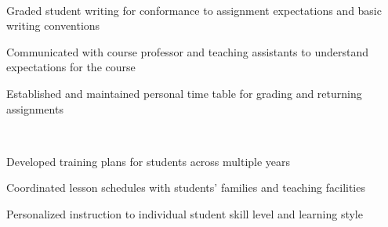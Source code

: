\documentclass[]{deedy-resume-chloedorst}
\begin{document}
\begin{minipage}[t]{0.66\textwidth}
\begin{tightemize}
\end{tightemize}
\sectionsep
\sectionsep
\sectionsep
{} 
\sectionsep\\
\begin{tightemize}
	\item Graded student writing for conformance to assignment expectations and basic writing conventions
	\item Communicated with course professor and teaching assistants to understand expectations for the course
	\item Established and maintained personal time table for grading and returning assignments
\end{tightemize}
\sectionsep
\sectionsep
\sectionsep
{} 
\sectionsep\\
\begin{tightemize}
	\item Developed training plans for students across multiple years
	\item Coordinated lesson schedules with students' families and teaching facilities
	\item Personalized instruction to individual student skill level and learning style
\end{tightemize}
\sectionsep



\end{minipage} 
\end{document}
